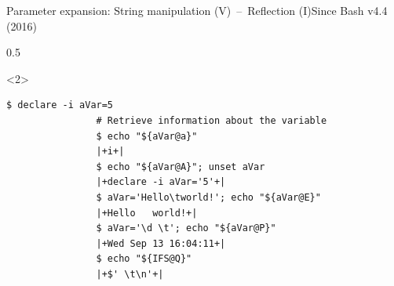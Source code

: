 \begin{frame}[fragile]{Parameter expansion: String manipulation (V)~--~Reflection (I)}{Since Bash v4.4 (2016)}
\begin{overlayarea}{\textwidth}{0.5\textheight}
\begin{onlyenv}
        \end{onlyenv}
        \begin{onlyenv}<2>
            \begin{lstlisting}[style=MyBash, style=oddnumbers, aboveskip=3mm]
                $ declare -i aVar=5
                # Retrieve information about the variable
                $ echo "${aVar@a}"
                |+i+|
                $ echo "${aVar@A}"; unset aVar
                |+declare -i aVar='5'+|
                $ aVar='Hello\tworld!'; echo "${aVar@E}"
                |+Hello   world!+|
                $ aVar='\d \t'; echo "${aVar@P}"
                |+Wed Sep 13 16:04:11+|
                $ echo "${IFS@Q}"
                |+$' \t\n'+|
            \end{lstlisting}
        \end{onlyenv}
    \end{overlayarea}
\end{frame}
